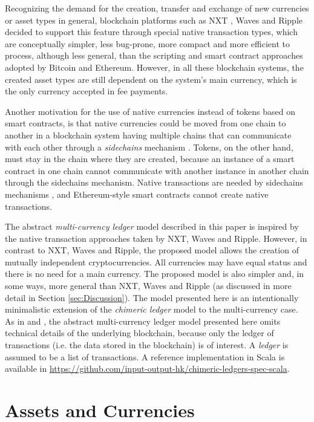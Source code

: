 \documentclass{llncs}
\begin{document}
Recognizing the demand for the creation, transfer and exchange of new currencies or asset types in general, blockchain platforms such as NXT \cite{NXT}, Waves \cite{Waves} and Ripple \cite{Ripple} decided to support this feature through special native transaction types, which are conceptually simpler, less bug-prone, more compact and more efficient to process, although less general, than the scripting and smart contract approaches adopted by Bitcoin and Ethereum. However, in all these blockchain systems, the created asset types are still dependent on the system's main currency, which is the only currency accepted in fee payments.

Another motivation for the use of native currencies instead of tokens based on smart contracts, is that native currencies could be moved from one chain to another in a blockchain system having multiple chains that can communicate with each other through a \emph{sidechains} mechanism \cite{Sidechains,SidechainsOuroboros}. Tokens, on the other hand, must stay in the chain where they are created, because an instance of a smart contract in one chain cannot communicate with another instance in another chain through the sidechains mechanism. Native transactions are needed by sidechains mechanisms \cite{SidechainsOuroboros}, and Ethereum-style smart contracts cannot create native transactions.

The abstract \emph{multi-currency ledger} model described in this paper is inspired by the native transaction approaches taken by NXT, Waves and Ripple. However, in contrast to NXT, Waves and Ripple, the proposed model allows the creation of mutually independent cryptocurrencies. All currencies may have equal status and there is no need for a main currency. The proposed model is also simpler and, in some ways, more general than NXT, Waves and Ripple (as discussed in more detail in Section \ref{sec:Discussion}). The model presented here is an intentionally minimalistic extension of the \emph{chimeric ledger} model \cite{ChimericLedgers} to the multi-currency case. As in \cite{ChimericLedgers} and \cite{UTxOScripts}, the abstract multi-currency ledger model presented here omits technical details of the underlying blockchain, because only the ledger of transactions (i.e. the data stored in the blockchain) is of interest. A \emph{ledger} is assumed to be a list of transactions.
%
A reference implementation in Scala is available in \url{https://github.com/input-output-hk/chimeric-ledgers-spec-scala}.


\section{Assets and Currencies}
\label{sec:Preliminaries}
\end{document}
